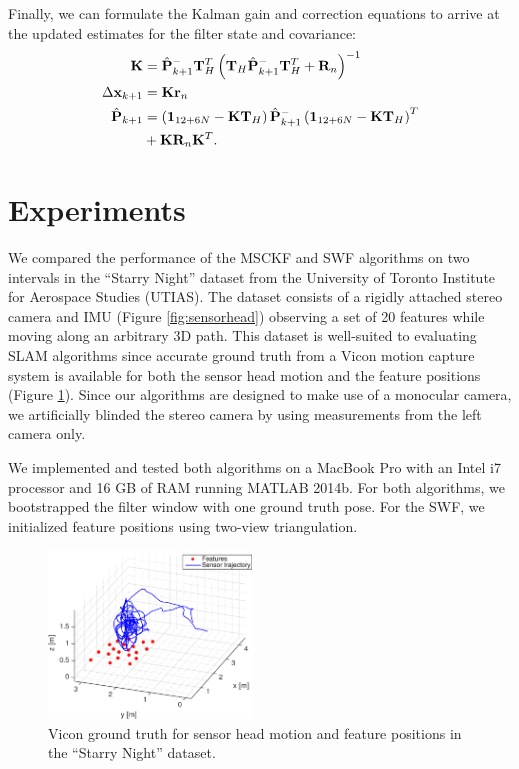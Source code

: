\documentclass[letterpaper, 10 pt, conference]{ieeeconf}  %
\def\Vec#1{\mathbf{#1}}
\begin{document}
Finally, we can formulate the Kalman gain and correction equations to arrive at the updated estimates for the filter state and covariance:
\begin{align}
    \Vec{K} &= \hat{\Vec{P}}^-_{k+1}\Vec{T}_{H}^T\left(\Vec{T}_{H}\hat{\Vec{P}}^-_{k+1}\Vec{T}_{H}^T + \Vec{R}_{n} \right)^{-1} \\
    \Delta\Vec{x}_{k+1} &= \Vec{K}\Vec{r}_{n} \\
    \hat{\Vec{P}}_{k+1} &= \left(\Vec{1}_{12+6N} - \Vec{K}\Vec{T}_{H} \right)\hat{\Vec{P}}^-_{k+1}\left(\Vec{1}_{12+6N} - \Vec{K}\Vec{T}_{H} \right)^T \notag \\ 
                        &+ \Vec{K}\Vec{R}_{n}\Vec{K}^T .
\end{align}

\section{Experiments} \label{sec:experiments}
We compared the performance of the MSCKF and SWF algorithms on two intervals in the ``Starry Night'' dataset from the University of Toronto Institute for Aerospace Studies (UTIAS).
The dataset consists of a rigidly attached stereo camera and IMU (Figure \ref{fig:sensorhead}) observing a set of 20 features while moving along an arbitrary 3D path.
This dataset is well-suited to evaluating SLAM algorithms since accurate ground truth from a Vicon motion capture system is available for both the sensor head motion and the feature positions (Figure \ref{fig:trajectory_groundtruth}).
Since our algorithms are designed to make use of a monocular camera, we artificially blinded the stereo camera by using measurements from the left camera only.

We implemented and tested both algorithms on a MacBook Pro with an Intel i7 processor and 16 GB of RAM running MATLAB 2014b.
For both algorithms, we bootstrapped the filter window with one ground truth pose.
For the SWF, we initialized feature positions using two-view triangulation.



\begin{figure}
    \centering
    \includegraphics[width=0.48\textwidth]{figs/trajectory_groundtruth}
    \caption{Vicon ground truth for sensor head motion and feature positions in the ``Starry Night'' dataset.}
    \label{fig:trajectory_groundtruth}
\end{figure}
\end{document}
